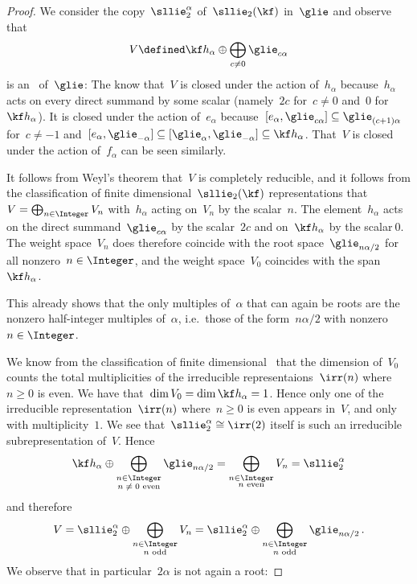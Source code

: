 \begin{proof}
  We consider the copy~$\sllie_2^\alpha$ of~$\sllie_2(\kf)$ in~$\glie$ and observe that
  \[
    V
    \defined
    \kf h_\alpha
    \oplus
    \bigoplus_{\substack{c \neq 0}} \glie_{c\alpha}
  \]
  is an~{} of~$\glie$:
  The know that~$V$ is closed under the action of~$h_\alpha$ because~$h_\alpha$ acts on every direct summand by some scalar (namely~$2c$ for~$c \neq 0$ and~$0$ for~$\kf h_\alpha$).
  It is closed under the action of~$e_\alpha$ because~$[e_\alpha, \glie_{c\alpha}] \subseteq \glie_{(c+1)\alpha}$ for~$c \neq -1$ and~$[e_\alpha, \glie_{-\alpha}] \subseteq [\glie_\alpha, \glie_{-\alpha}] \subseteq \kf h_\alpha$.
  That~$V$ is closed under the action of~$f_\alpha$ can be seen similarly.
  
  It follows from Weyl’s theorem that~$V$ is completely reducible, and it follows from the classification of finite dimensional~$\sllie_2(\kf)$ representations that~$V = \bigoplus_{n \in \Integer} V_n$ with~$h_\alpha$ acting on~$V_n$ by the scalar~$n$.
  The element~$h_\alpha$ acts on the direct summand~$\glie_{c\alpha}$ by the scalar~$2c$ and on~$\kf h_\alpha$ by the scalar$~0$.
  The weight space~$V_n$ does therefore coincide with the root space~$\glie_{n \alpha / 2}$ for all nonzero~$n \in \Integer$, and the weight space~$V_0$ coincides with the span~$\kf h_\alpha$.
  
  This already shows that the only multiples of~$\alpha$ that can again be roots are the nonzero half-integer multiples of~$\alpha$, i.e.\ those of the form~$n \alpha / 2$ with nonzero~$n \in \Integer$.
  
  We know from the classification of finite dimensional~{} that the dimension of~$V_0$ counts the total multiplicities of the irreducible representaions~$\irr(n)$ where~$n \geq 0$ is even.
  We have that~$\dim V_0 = \dim \kf h_\alpha = 1$.
  Hence only one of the irreducible representation~$\irr(n)$ where~$n \geq 0$ is even appears in~$V$, and only with multiplicity~$1$.
  We see that~$\sllie_2^\alpha \cong \irr(2)$ itself is such an irreducible subrepresentation of~$V$.
  Hence
  \[
    \kf h_\alpha
    \oplus
    \bigoplus_{\substack{n \in \Integer \\ \text{$n \neq 0$ even}}}
    \glie_{n \alpha/2}
    =
    \bigoplus_{\substack{n \in \Integer \\ \text{$n$ even}}}
    V_n
    =
    \sllie_2^\alpha
  \]
  and therefore
  \[
    V
    =
    \sllie_2^\alpha
    \oplus
    \bigoplus_{\substack{n \in \Integer \\ \text{$n$ odd}}}
    V_n
    =
    \sllie_2^\alpha
    \oplus
    \bigoplus_{\substack{n \in \Integer \\ \text{$n$ odd}}}
    \glie_{n \alpha/2}  \,.
  \]
  We observe that in particular~$2\alpha$ is not again a root:
  

\end{proof}
